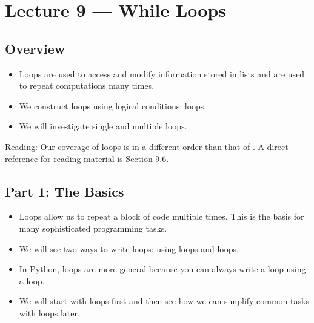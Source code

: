 \documentclass[letterpaper,10pt,english]{sphinxmanual}
\begin{document}
\chapter{Lecture 9 — While Loops}
\label{\detokenize{lecture_notes/lec09_loops1_while:lecture-9-while-loops}}\label{\detokenize{lecture_notes/lec09_loops1_while::doc}}

\section{Overview}
\label{\detokenize{lecture_notes/lec09_loops1_while:overview}}\begin{itemize}
\item {} 
Loops are used to access and modify information stored in lists and
are used to repeat computations many times.

\item {} 
We construct loops using logical conditions:  loops.

\item {} 
We will investigate single and multiple loops.

\end{itemize}

Reading:  Our coverage of loops is in a different order than that of
.  A direct reference for reading material is
Section 9.6.


\section{Part 1: The Basics}
\label{\detokenize{lecture_notes/lec09_loops1_while:part-1-the-basics}}\begin{itemize}
\item {} 
Loops allow us to repeat a block of code multiple times. This is
the basis for many sophisticated programming tasks.

\item {} 
We will see two ways to write loops: using  loops and  loops.

\item {} 
In Python,  loops are more general because you
can always write a  loop using a  loop.

\item {} 
We will start with  loops first and then see how we can
simplify common tasks with  loops later.

\end{itemize}
\end{document}
